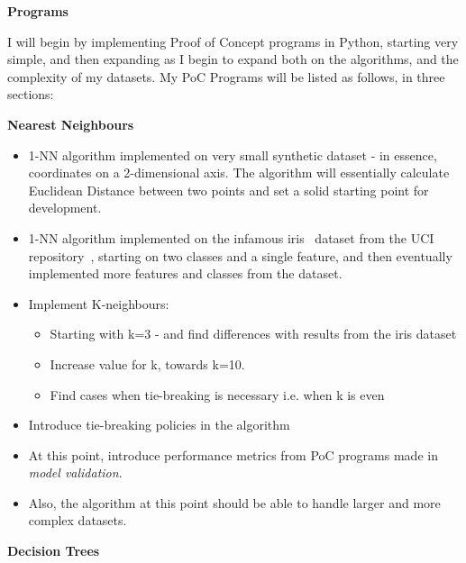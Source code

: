 \documentclass[letterpaper,10pt]{article}
\begin{document}
\textbf{Programs} \par
I will begin by implementing Proof of Concept programs in Python, starting very simple, and then expanding as I begin to expand both on the algorithms, and the complexity of my datasets. My PoC Programs will be listed as follows, in three sections: \par
\textbf{Nearest Neighbours}
\begin{itemize}
    \item 1-NN algorithm implemented on very small synthetic dataset - in essence, coordinates on a 2-dimensional axis. The algorithm will essentially calculate Euclidean Distance between two points and set a solid starting point for development.
    \item 1-NN algorithm implemented on the infamous iris~\cite{irisdata} dataset from the UCI repository~\cite{uci}, starting on two classes and a single feature, and then eventually implemented more features and classes from the dataset.
    \item Implement K-neighbours:
    \begin{itemize}
        \item Starting with k=3 - and find differences with results from the iris dataset
        \item Increase value for k, towards k=10. 
        \item Find cases when tie-breaking is necessary i.e. when k is even
    \end{itemize}
    \item Introduce tie-breaking policies in the algorithm
    \item At this point, introduce performance metrics from PoC programs made in \textit{model validation}.
    \item Also, the algorithm at this point should be able to handle larger and more complex datasets.
\end{itemize}
\textbf{Decision Trees}
\end{document}
